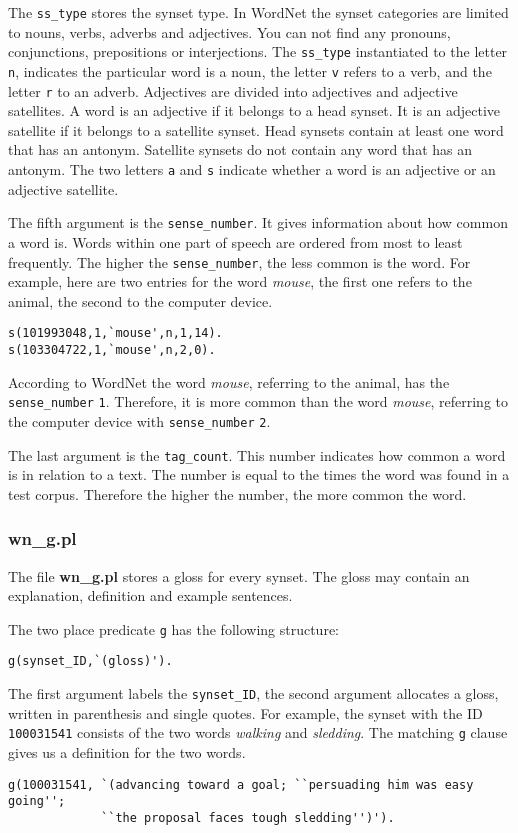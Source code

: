 \documentclass[12pt]{article}
\begin{document}
The {\tt ss\_type} stores the synset type. In WordNet the synset categories are limited to nouns, verbs, adverbs and adjectives.
You can not find any pronouns, conjunctions, prepositions or interjections.
The {\tt ss\_type} instantiated to the letter {\tt n}, indicates the particular word is a noun, the letter {\tt v} refers to a verb,
and the letter {\tt r} to an adverb.
Adjectives are divided into adjectives and adjective satellites.
A word is an adjective if it belongs to a head synset. It is an adjective satellite if it belongs to a
satellite synset. Head synsets contain at least one word that has an antonym. Satellite synsets do not contain
any word that has an antonym. The two letters {\tt a} and {\tt s} indicate whether a word is an adjective or an adjective satellite.

The fifth argument is the {\tt sense\_number}. It gives information about how common a word is.
Words within one part of speech are ordered from most to least frequently. The higher the {\tt sense\_number}, the less common
is the word. For example, here are two entries for the word \emph{mouse}, the first one refers to the animal,
the second to the computer device.
\begin{verbatim}
s(101993048,1,`mouse',n,1,14).
s(103304722,1,`mouse',n,2,0).
\end{verbatim}
According to WordNet the word \emph{mouse}, referring to the animal, has the {\tt sense\_number} {\tt 1}. Therefore, it
is more common than the word \emph{mouse}, referring to the computer device with {\tt sense\_number} {\tt 2}.

The last argument is the {\tt tag\_count}. This number indicates how common a word is in relation to a text.
The number is equal to the times the word was found in a test corpus. Therefore the higher the number,
the more common the word.

\subsubsection{wn\_g.pl}


The file {\bfseries wn\_g.pl} stores a gloss for every synset.
The gloss may contain an explanation, definition and example sentences.

The two place predicate {\tt g} has the following structure:
\begin{verbatim}
g(synset_ID,`(gloss)').
\end{verbatim}
The first argument labels the {\tt synset\_ID}, the second argument allocates a gloss, written in
parenthesis and single quotes. For example, the synset with the ID {\tt 100031541} consists of the two words
\emph{walking} and \emph{sledding}. The matching {\tt g} clause gives us a definition for the two words.
\begin{verbatim}
g(100031541, `(advancing toward a goal; ``persuading him was easy going'';
             ``the proposal faces tough sledding'')').
\end{verbatim}
\end{document}
